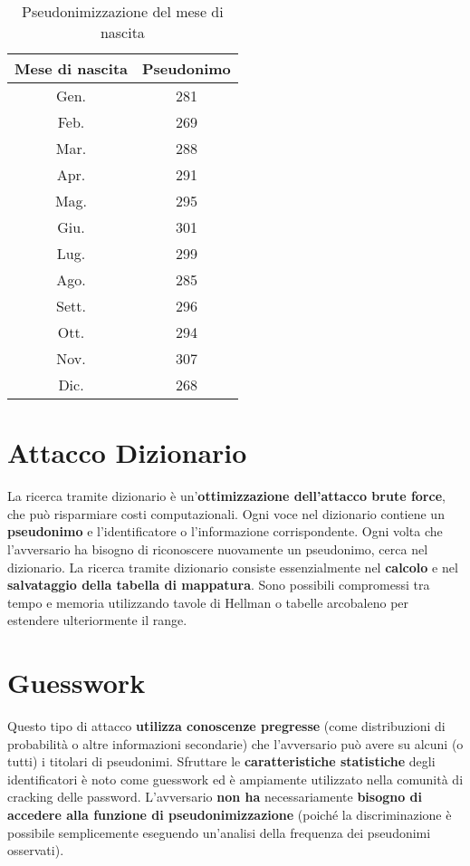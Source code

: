 \begin{table}[h]
\centering
\begin{tabular}{|c|c|}
\hline
Mese di nascita & Pseudonimo \\
\hline
Gen. & 281 \\
Feb. & 269 \\
Mar. & 288 \\
Apr. & 291 \\
Mag. & 295 \\
Giu. & 301 \\
Lug. & 299 \\
Ago. & 285 \\
Sett. & 296 \\
Ott. & 294 \\
Nov. & 307 \\
Dic. & 268 \\
\hline
\end{tabular}
\caption{Pseudonimizzazione del mese di nascita}
\end{table}

\section{Attacco Dizionario}
La ricerca tramite dizionario è un'\textbf{ottimizzazione dell'attacco brute force}, che può risparmiare costi computazionali. 
Ogni voce nel dizionario contiene un \textbf{pseudonimo} e l'identificatore o l'informazione corrispondente. Ogni volta che l'avversario ha bisogno di riconoscere nuovamente un pseudonimo, cerca nel dizionario. 
La ricerca tramite dizionario consiste essenzialmente nel \textbf{calcolo} e nel \textbf{salvataggio della tabella di mappatura}. Sono possibili compromessi tra tempo e memoria utilizzando tavole di Hellman o tabelle arcobaleno per estendere ulteriormente il range. 

\section{Guesswork}

Questo tipo di attacco\textbf{ utilizza conoscenze pregresse} (come distribuzioni di probabilità o altre informazioni secondarie) che l'avversario può avere su alcuni (o tutti) i titolari di pseudonimi.
Sfruttare le\textbf{ caratteristiche statistiche} degli identificatori è noto come guesswork ed è ampiamente utilizzato nella comunità di cracking delle password. 
L'avversario \textbf{non ha} necessariamente \textbf{bisogno di accedere alla funzione di pseudonimizzazione} (poiché la discriminazione è possibile semplicemente eseguendo un'analisi della frequenza dei pseudonimi osservati).

